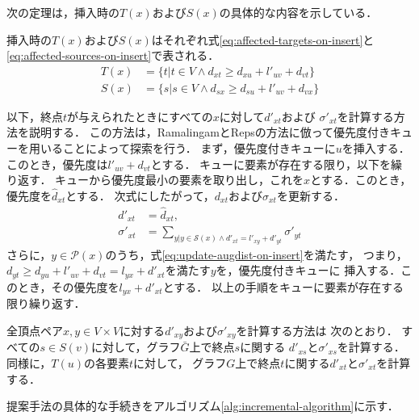 次の定理は，挿入時の$T(x)$および$S(x)$の具体的な内容を示している．
\begin{theorem}
  \label{thm:affected-vertices-on-insert}
  挿入時の$T(x)$および$S(x)$はそれぞれ式\eqref{eq:affected-targets-on-insert}と
  \eqref{eq:affected-sources-on-insert}で表される．
  \begin{align}
    T(x)&=\{t|t\in V\land d_{xt}\geq d_{xu}+l'_{uv}+d_{vt}\}
    \label{eq:affected-targets-on-insert} \\
    S(x)&=\{s|s\in V\land d_{sx}\geq d_{su}+l'_{uv}+d_{vx}\}
    \label{eq:affected-sources-on-insert}
  \end{align}
\end{theorem}

以下，終点$t$が与えられたときにすべての$x$に対して$d'_{xt}$および
$\sigma'_{xt}$を計算する方法を説明する．
この方法は，RamalingamとRepsの方法に倣って優先度付きキューを用いることによって探索を行う．
まず，優先度付きキューに$u$を挿入する．このとき，優先度は$l'_{uv}+d_{vt}$とする．
キューに要素が存在する限り，以下を繰り返す．
キューから優先度最小の要素を取り出し，これを$x$とする．このとき，
優先度を$\hat{d}_{xt}$とする．
次式にしたがって，$d_{xt}$および$\sigma_{xt}$を更新する．
\begin{equation*}
  \begin{aligned}
    d'_{xt}&=\hat{d}_{xt},\\
    \sigma'_{xt}&=\sum_{y|y\in\mathcal{S}(x)\land d'_{xt}=l'_{xy}+d'_{yt}}\sigma'_{yt}
  \end{aligned}
\end{equation*}
さらに，$y\in\mathcal{P}(x)$のうち，式\eqref{eq:update-augdist-on-insert}を満たす，
つまり，$d_{yt}\geq d_{yu}+l'_{uv}+d_{vt}=l_{yx}+d'_{xt}$を満たす$y$を，優先度付きキューに
挿入する．このとき，その優先度を$l_{yx}+d'_{xt}$とする．
以上の手順をキューに要素が存在する限り繰り返す．

全頂点ペア$x,y\in V\times V$に対する$d'_{xy}$および$\sigma'_{xy}$を計算する方法は
次のとおり．
すべての$s\in S(v)$に対して，グラフ$\bar{G}$上で終点$s$に関する
$d'_{xs}$と$\sigma'_{xs}$を計算する．
同様に，$T(u)$の各要素$t$に対して，
グラフ$G$上で終点$t$に関する$d'_{xt}$と$\sigma'_{xt}$を計算する．

提案手法の具体的な手続きをアルゴリズム\ref{alg:incremental-algorithm}に示す．

